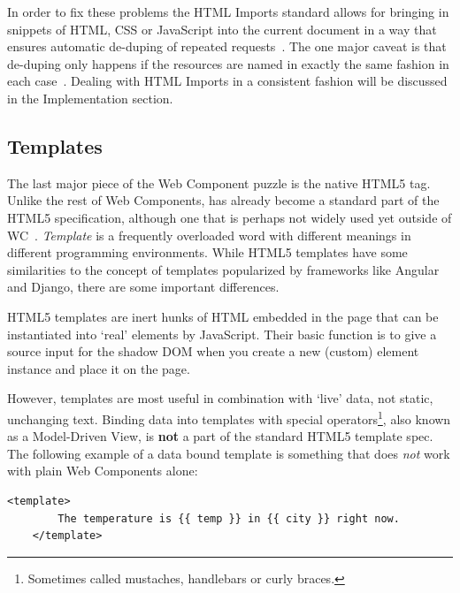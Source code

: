 In order to fix these problems the HTML Imports standard allows for bringing in snippets of HTML, CSS or JavaScript into the current document in a way that ensures automatic de-duping of repeated requests~\cite{w3ccontributors2015-a}.
The one major caveat is that de-duping only happens if the resources are named in exactly the same fashion in each case~\cite{bidelman2013}.
Dealing with HTML Imports in a consistent fashion will be discussed in the Implementation section.

\subsection{Templates}
The last major piece of the Web Component puzzle is the native HTML5  tag. 
Unlike the rest of Web Components,  has already become a standard part of the HTML5 specification, 
although one that is perhaps not widely used yet outside of WC~\cite{w3ccontributors2015-c}.
\textit{Template} is a frequently overloaded word with different meanings in different programming environments.
While HTML5 templates have some similarities to the concept of templates popularized by frameworks like Angular and Django, there are some important differences.

HTML5 templates are inert hunks of HTML embedded in the page that can be instantiated into `real' elements by JavaScript.
Their basic function is to give a source input for the shadow DOM when you create a new (custom) element instance and place it on the page.

However, templates are most useful in combination with `live' data, not static, unchanging text.
Binding data into templates with special operators\footnote{
Sometimes called mustaches, handlebars or curly braces. },
also known as a Model-Driven View,
is \textbf{not} a part of the standard HTML5 template spec.
The following example of a data bound template is something that does \textit{not} work with plain Web Components alone:

\begin{lstlisting}[language=HTML5,caption={An example of a data-bound template.},label=l:dbtemplate]
	<template> 
		The temperature is {{ temp }} in {{ city }} right now.
	</template>
\end{lstlisting}

